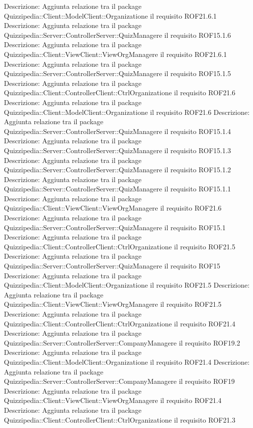 Descrizione: Aggiunta relazione tra il package Quizzipedia::Client::ModelClient::Organizatione il requisito ROF21.6.1 
Descrizione: Aggiunta relazione tra il package Quizzipedia::Server::ControllerServer::QuizManagere il requisito ROF15.1.6 
Descrizione: Aggiunta relazione tra il package Quizzipedia::Client::ViewClient::ViewOrgManagere il requisito ROF21.6.1 
Descrizione: Aggiunta relazione tra il package Quizzipedia::Server::ControllerServer::QuizManagere il requisito ROF15.1.5 
Descrizione: Aggiunta relazione tra il package Quizzipedia::Client::ControllerClient::CtrlOrganizatione il requisito ROF21.6 
Descrizione: Aggiunta relazione tra il package Quizzipedia::Client::ModelClient::Organizatione il requisito ROF21.6 
Descrizione: Aggiunta relazione tra il package Quizzipedia::Server::ControllerServer::QuizManagere il requisito ROF15.1.4 
Descrizione: Aggiunta relazione tra il package Quizzipedia::Server::ControllerServer::QuizManagere il requisito ROF15.1.3 
Descrizione: Aggiunta relazione tra il package Quizzipedia::Server::ControllerServer::QuizManagere il requisito ROF15.1.2 
Descrizione: Aggiunta relazione tra il package Quizzipedia::Server::ControllerServer::QuizManagere il requisito ROF15.1.1 
Descrizione: Aggiunta relazione tra il package Quizzipedia::Client::ViewClient::ViewOrgManagere il requisito ROF21.6 
Descrizione: Aggiunta relazione tra il package Quizzipedia::Server::ControllerServer::QuizManagere il requisito ROF15.1 
Descrizione: Aggiunta relazione tra il package Quizzipedia::Client::ControllerClient::CtrlOrganizatione il requisito ROF21.5 
Descrizione: Aggiunta relazione tra il package Quizzipedia::Server::ControllerServer::QuizManagere il requisito ROF15 
Descrizione: Aggiunta relazione tra il package Quizzipedia::Client::ModelClient::Organizatione il requisito ROF21.5 
Descrizione: Aggiunta relazione tra il package Quizzipedia::Client::ViewClient::ViewOrgManagere il requisito ROF21.5 
Descrizione: Aggiunta relazione tra il package Quizzipedia::Client::ControllerClient::CtrlOrganizatione il requisito ROF21.4 
Descrizione: Aggiunta relazione tra il package Quizzipedia::Server::ControllerServer::CompanyManagere il requisito ROF19.2 
Descrizione: Aggiunta relazione tra il package Quizzipedia::Client::ModelClient::Organizatione il requisito ROF21.4 
Descrizione: Aggiunta relazione tra il package Quizzipedia::Server::ControllerServer::CompanyManagere il requisito ROF19 
Descrizione: Aggiunta relazione tra il package Quizzipedia::Client::ViewClient::ViewOrgManagere il requisito ROF21.4 
Descrizione: Aggiunta relazione tra il package Quizzipedia::Client::ControllerClient::CtrlOrganizatione il requisito ROF21.3 
